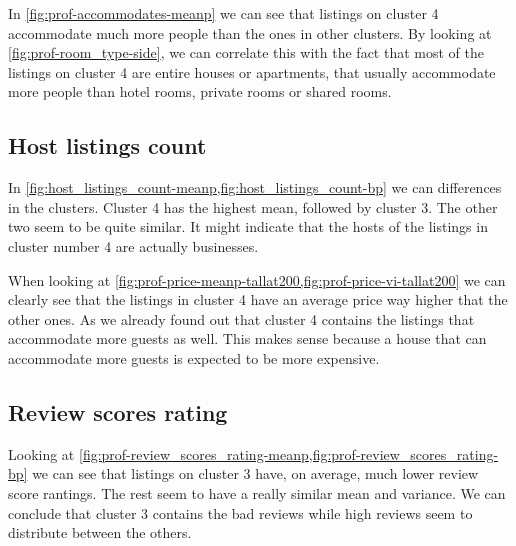 
In \cref{fig:prof-accommodates-meanp} we can see that listings on cluster 4 accommodate
much more people than the ones in other clusters. By looking at \cref{fig:prof-room_type-side}, we can correlate this with the fact that most of the listings on cluster 4 are entire houses or apartments, that usually accommodate more people than hotel rooms, private rooms or shared rooms. 

\clearpage
\subsection{Host listings count}%

In \cref{fig:host_listings_count-meanp,fig:host_listings_count-bp} we can differences in the clusters.
Cluster 4 has the highest mean, followed by cluster 3. The other two seem to be quite 
similar. It might indicate that the hosts of the listings in cluster number 4 are actually businesses.

When looking at \cref{fig:prof-price-meanp-tallat200,fig:prof-price-vi-tallat200} we can clearly see that the listings in cluster 4 have an average price way higher that the other ones. As we already found out that cluster 4 contains the listings that accommodate more guests as well. This makes sense because a house that can accommodate more guests is expected to be more expensive. 


\subsection{Review scores rating}%
\label{sub:prof-review_scores_rating}


Looking at \cref{fig:prof-review_scores_rating-meanp,fig:prof-review_scores_rating-bp} we can see that listings on cluster 3 have, on average, much lower review score rantings. The rest seem to have a really similar mean and variance. We can conclude that cluster 3 contains the bad reviews while high reviews seem to distribute between the others.

